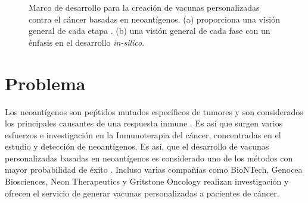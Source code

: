 \begin{figure}[h]
	\centering
	
	\caption[\textit{Pipeline} para el desarrollo de vacunas basadas en neoantígenos]{Marco de desarrollo para la creación de vacunas personalizadas contra el cáncer basadas en neoantígenos. (a) proporciona una visión general de cada etapa \citep{han2020progress}. (b) una visión general de cada fase con un énfasis en el desarrollo \textit{in-silico}.}
	\label{fig:vaccines}
\end{figure}

\section{Problema}
\label{sec:problema}

Los neoantígenos son peṕtidos mutados específicos de tumores y son considerados los principales causantes de una respuesta inmune \citep{borden2022cancer, chen2021challenges, gopanenko2020main}. Es así que surgen varios esfuerzos e investigación en la Inmunoterapia del cáncer, concentradas en el estudio y detección de neoantígenos. Es así, que el desarrollo de vacunas personalizadas basadas en neoantígenos es considerado uno de los métodos con mayor probabilidad de éxito \citep{borden2022cancer}. Incluso varias compañías como BioNTech, Genocea Biosciences, Neon Therapeutics y Gritstone Oncology realizan investigación y ofrecen el servicio de generar vacunas personalizadas a pacientes de cáncer.

